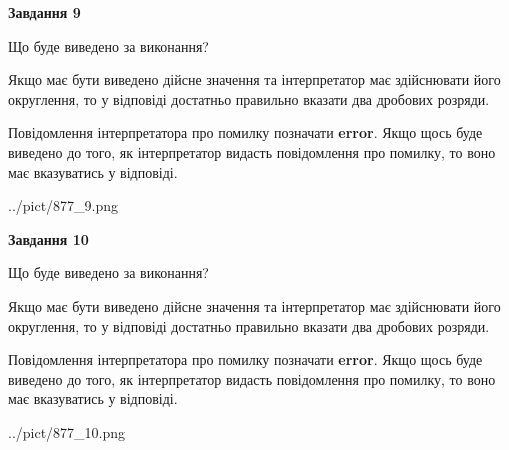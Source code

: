 \documentclass[12pt, ukrainian]{article}
\begin{document}
{\begin {Large}
{\begin {center}\textbf{Завдання 9}\end {center}}\par
Що буде виведено за виконання? \par

Якщо має бути виведено дійсне значення та інтерпретатор має здійснювати його округлення, 
то у відповіді достатньо правильно вказати два дробових розряди.

Повідомлення інтерпретатора про помилку позначати \textbf{error}.
Якщо щось буде виведено до того, як інтерпретатор видасть повідомлення про помилку, 
то воно має вказуватись у відповіді. \par

\begin{center}
	{../pict/877_9.png}
\end{center}
\newpage

{\begin {center}\textbf{Завдання 10}\end {center}}\par
Що буде виведено за виконання? \par

Якщо має бути виведено дійсне значення та інтерпретатор має здійснювати його округлення, 
то у відповіді достатньо правильно вказати два дробових розряди.

Повідомлення інтерпретатора про помилку позначати \textbf{error}.
Якщо щось буде виведено до того, як інтерпретатор видасть повідомлення про помилку, 
то воно має вказуватись у відповіді. \par

\begin{center}
	{../pict/877_10.png}
\end{center}
\newpage

\end {Large}}
\end{document}
